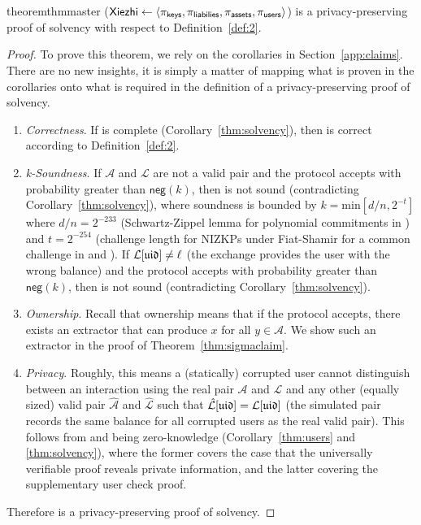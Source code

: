 
\section{\Sys}

\begin{restatable}{theorem}{thmmaster}
\label{thm:master}
\Sys ($\textsf{Xiezhi}\leftarrow\langle \pi_\mathsf{keys}, \pi_\mathsf{liabilies}, \pi_\mathsf{assets}, \pi_\mathsf{users} \rangle$) is a privacy-preserving proof of solvency with respect to Definition~\ref{def:2}. 
\end{restatable}

\begin{proof}
To prove this theorem, we rely on the corollaries in Section~\ref{app:claims}. There are no new insights, it is simply a matter of mapping what is proven in the corollaries onto what is required in the definition of a privacy-preserving proof of solvency.
\begin{enumerate}
    \item \textit{Correctness}. If \pos is complete (Corollary~\ref{thm:solvency}), then \Sys is correct according to Definition~\ref{def:2}.
    \item \textit{k-Soundness}. If $\mathcal{A}$ and $\mathcal{L}$ are not a valid pair and the protocol accepts with probability greater than $\mathsf{neg}(k)$, then \pos is not sound (contradicting Corollary~\ref{thm:solvency}), where soundness is bounded by $k=\mathrm{min}[d/n,2^{-t}]$ where $d/n=2^{-233}$ (Schwartz-Zippel lemma for polynomial commitments in \bls) and $t=2^{-254}$ (challenge length for NIZKPs under Fiat-Shamir for a common challenge in \secp and \bls). If $\mathcal{L}[\mathfrak{uid}] \neq \ell$ (\ie the exchange provides the user with the wrong balance) and the protocol accepts with probability greater than $\mathsf{neg}(k)$, then \pos is not sound (contradicting Corollary~\ref{thm:solvency}).
    \item \textit{Ownership}. Recall that ownership means that if the protocol accepts, there exists an extractor that can produce $x$ for all $y \in \mathcal{A}$. We show such an extractor in the proof of Theorem~\ref{thm:sigmaclaim}.
    \item \textit{Privacy}. Roughly, this means a (statically) corrupted user cannot distinguish between an interaction using the real pair $\mathcal{A}$ and $\mathcal{L}$ and any other (equally sized) valid pair $\hat{\mathcal{A}}$ and $\hat{\mathcal{L}}$ such that $\hat{\mathcal{L}}[\mathfrak{uid}] = \mathcal{L}[\mathfrak{uid}]$ (\ie the simulated pair records the same balance for all corrupted users as the real valid pair). This follows from \userproof and \pos being zero-knowledge (Corollary~\ref{thm:users} and \ref{thm:solvency}), where the former covers the case that the universally verifiable proof reveals private information, and the latter covering the supplementary user check proof. 
\end{enumerate}
Therefore \Sys is a privacy-preserving proof of solvency.
\end{proof}

